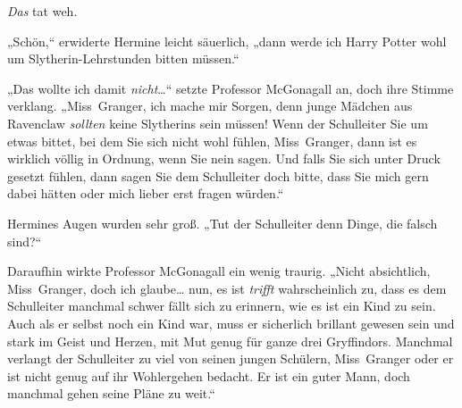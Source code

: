 \emph{Das} tat weh.

„Schön,“ erwiderte Hermine leicht säuerlich, „dann werde ich Harry Potter wohl um Slytherin-Lehrstunden bitten müssen.“

„Das wollte ich damit \emph{nicht}…“ setzte Professor McGonagall an, doch ihre Stimme verklang. „Miss~Granger, ich mache mir Sorgen, denn junge Mädchen aus Ravenclaw \emph{sollten} keine Slytherins sein müssen! Wenn der Schulleiter Sie um etwas bittet, bei dem Sie sich nicht wohl fühlen, Miss~Granger, dann ist es wirklich völlig in Ordnung, wenn Sie nein sagen. Und falls Sie sich unter Druck gesetzt fühlen, dann sagen Sie dem Schulleiter doch bitte, dass Sie mich gern dabei hätten oder mich lieber erst fragen würden.“

Hermines Augen wurden sehr groß. „Tut der Schulleiter denn Dinge, die falsch sind?“

Daraufhin wirkte Professor McGonagall ein wenig traurig. „Nicht absichtlich, Miss~Granger, doch ich glaube… nun, es ist \emph{trifft} wahrscheinlich zu, dass es dem Schulleiter manchmal schwer fällt sich zu erinnern, wie es ist ein Kind zu sein. Auch als er selbst noch ein Kind war, muss er sicherlich brillant gewesen sein und stark im Geist und Herzen, mit Mut genug für ganze drei Gryffindors. Manchmal verlangt der Schulleiter zu viel von seinen jungen Schülern, Miss~Granger oder er ist nicht genug auf ihr Wohlergehen bedacht. Er ist ein guter Mann, doch manchmal gehen seine Pläne zu weit.“

